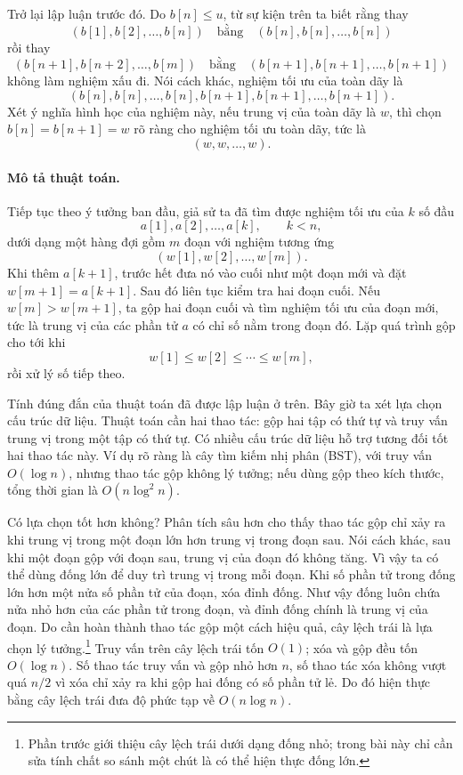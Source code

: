 \documentclass[11pt]{article}
\begin{document}
Trở lại lập luận trước đó. Do \(b[n]\le u\), từ sự kiện trên ta biết rằng thay
\[
  (b[1],b[2],\ldots,b[n])
  \quad\text{bằng}\quad
  (b[n],b[n],\ldots,b[n])
\]
rồi thay
\[
  (b[n+1],b[n+2],\ldots,b[m])
  \quad\text{bằng}\quad
  (b[n+1],b[n+1],\ldots,b[n+1])
\]
không làm nghiệm xấu đi. Nói cách khác, nghiệm tối ưu của toàn dãy là
\[
  (b[n],b[n],\ldots,b[n],b[n+1],b[n+1],\ldots,b[n+1]).
\]
Xét ý nghĩa hình học của nghiệm này, nếu trung vị của toàn dãy là \(w\), thì
chọn \(b[n]=b[n+1]=w\) rõ ràng cho nghiệm tối ưu toàn dãy, tức là
\[
  (w,w,\ldots,w).
\]

\paragraph{Mô tả thuật toán.}
Tiếp tục theo ý tưởng ban đầu, giả sử ta đã tìm được nghiệm tối ưu của
\(k\) số đầu
\[
  a[1],a[2],\ldots,a[k],\qquad k<n,
\]
dưới dạng một hàng đợi gồm \(m\) đoạn với nghiệm tương ứng
\[
  (w[1],w[2],\ldots,w[m]).
\]
Khi thêm \(a[k+1]\), trước hết đưa nó vào cuối như một đoạn mới và đặt
\(w[m+1]=a[k+1]\). Sau đó liên tục kiểm tra hai đoạn cuối. Nếu
\(w[m]>w[m+1]\), ta gộp hai đoạn cuối và tìm nghiệm tối ưu của đoạn mới, tức là
trung vị của các phần tử \(a\) có chỉ số nằm trong đoạn đó. Lặp quá trình gộp
cho tới khi
\[
  w[1]\le w[2]\le\cdots\le w[m],
\]
rồi xử lý số tiếp theo.

Tính đúng đắn của thuật toán đã được lập luận ở trên. Bây giờ ta xét lựa chọn
cấu trúc dữ liệu. Thuật toán cần hai thao tác: gộp hai tập có thứ tự và truy vấn
trung vị trong một tập có thứ tự. Có nhiều cấu trúc dữ liệu hỗ trợ tương đối tốt
hai thao tác này. Ví dụ rõ ràng là cây tìm kiếm nhị phân (BST), với truy vấn
\(O(\log n)\), nhưng thao tác gộp không lý tưởng; nếu dùng gộp theo kích thước,
tổng thời gian là \(O(n\log^2 n)\).

Có lựa chọn tốt hơn không? Phân tích sâu hơn cho thấy thao tác gộp chỉ xảy ra
khi trung vị trong một đoạn lớn hơn trung vị trong đoạn sau. Nói cách khác, sau
khi một đoạn gộp với đoạn sau, trung vị của đoạn đó không tăng. Vì vậy ta có
thể dùng đống lớn để duy trì trung vị trong mỗi đoạn. Khi số phần tử trong đống
lớn hơn một nửa số phần tử của đoạn, xóa đỉnh đống. Như vậy đống luôn chứa nửa
nhỏ hơn của các phần tử trong đoạn, và đỉnh đống chính là trung vị của đoạn.
Do cần hoàn thành thao tác gộp một cách hiệu quả, cây lệch trái là lựa chọn lý
tưởng.\footnote{Phần trước giới thiệu cây lệch trái dưới dạng đống nhỏ; trong
bài này chỉ cần sửa tính chất so sánh một chút là có thể hiện thực đống lớn.}
Truy vấn trên cây lệch trái tốn \(O(1)\); xóa và gộp đều tốn \(O(\log n)\).
Số thao tác truy vấn và gộp nhỏ hơn \(n\), số thao tác xóa không vượt quá
\(n/2\) vì xóa chỉ xảy ra khi gộp hai đống có số phần tử lẻ. Do đó hiện thực
bằng cây lệch trái đưa độ phức tạp về \(O(n\log n)\).
\end{document}
